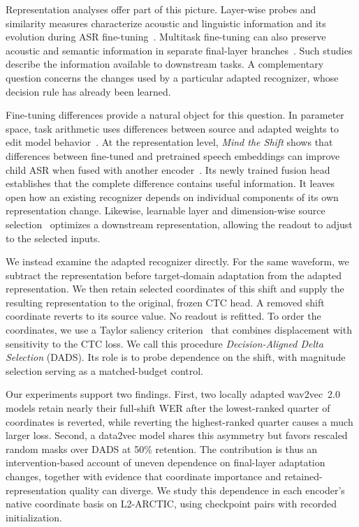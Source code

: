 \documentclass{article}
\begin{document}
Representation analyses offer part of this picture. Layer-wise probes and similarity measures characterize acoustic and linguistic information and its evolution during ASR fine-tuning~\cite{pasad2021layerwise,pasad2023comparative}. Multitask fine-tuning can also preserve acoustic and semantic information in separate final-layer branches~\cite{niu2025factorization}. Such studies describe the information available to downstream tasks. A complementary question concerns the changes used by a particular adapted recognizer, whose decision rule has already been learned.

Fine-tuning differences provide a natural object for this question. In parameter space, task arithmetic uses differences between source and adapted weights to edit model behavior~\cite{ilharco2023task}. At the representation level, \emph{Mind the Shift} shows that differences between fine-tuned and pretrained speech embeddings can improve child ASR when fused with another encoder~\cite{wang2026mind}. Its newly trained fusion head establishes that the complete difference contains useful information. It leaves open how an existing recognizer depends on individual components of its own representation change. Likewise, learnable layer and dimension-wise source selection~\cite{chiu2024selection} optimizes a downstream representation, allowing the readout to adjust to the selected inputs.

We instead examine the adapted recognizer directly. For the same waveform, we subtract the representation before target-domain adaptation from the adapted representation. We then retain selected coordinates of this shift and supply the resulting representation to the original, frozen CTC head. A removed shift coordinate reverts to its source value. No readout is refitted. To order the coordinates, we use a Taylor saliency criterion~\cite{molchanov2017pruning} that combines displacement with sensitivity to the CTC loss. We call this procedure \emph{Decision-Aligned Delta Selection} (DADS). Its role is to probe dependence on the shift, with magnitude selection serving as a matched-budget control.

Our experiments support two findings. First, two locally adapted wav2vec~2.0 models retain nearly their full-shift WER after the lowest-ranked quarter of coordinates is reverted, while reverting the highest-ranked quarter causes a much larger loss. Second, a data2vec model shares this asymmetry but favors rescaled random masks over DADS at 50\% retention. The contribution is thus an intervention-based account of uneven dependence on final-layer adaptation changes, together with evidence that coordinate importance and retained-representation quality can diverge. We study this dependence in each encoder's native coordinate basis on L2-ARCTIC, using checkpoint pairs with recorded initialization.
\end{document}
